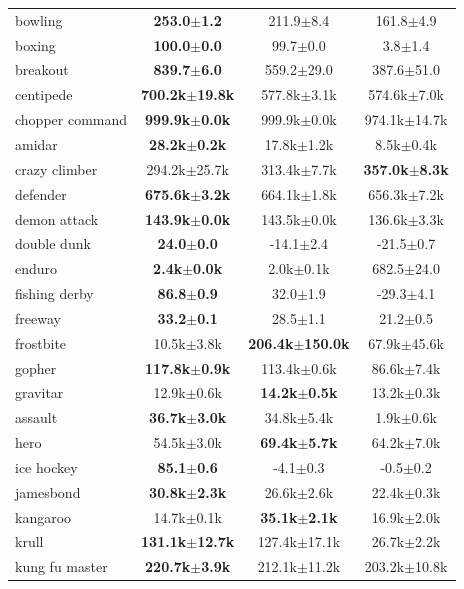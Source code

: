 \documentclass{article} %
\begin{document}
\begin{table}[ht!]
\begin{tabular}{l|c|c|c}
bowling  & \textbf{253.0$\pm$1.2} & 211.9$\pm$8.4 & 161.8$\pm$4.9 \\
boxing  & \textbf{100.0$\pm$0.0} & 99.7$\pm$0.0 & 3.8$\pm$1.4 \\
breakout  & \textbf{839.7$\pm$6.0} & 559.2$\pm$29.0 & 387.6$\pm$51.0 \\
centipede  & \textbf{700.2k$\pm$19.8k} & 577.8k$\pm$3.1k & 574.6k$\pm$7.0k \\
chopper command  & \textbf{999.9k$\pm$0.0k} & 999.9k$\pm$0.0k & 974.1k$\pm$14.7k \\
amidar  & \textbf{28.2k$\pm$0.2k} & 17.8k$\pm$1.2k & 8.5k$\pm$0.4k \\
crazy climber  & 294.2k$\pm$25.7k & 313.4k$\pm$7.7k & \textbf{357.0k$\pm$8.3k} \\
defender  & \textbf{675.6k$\pm$3.2k} & 664.1k$\pm$1.8k & 656.3k$\pm$7.2k \\
demon attack  & \textbf{143.9k$\pm$0.0k} & 143.5k$\pm$0.0k & 136.6k$\pm$3.3k \\
double dunk  & \textbf{24.0$\pm$0.0} & -14.1$\pm$2.4 & -21.5$\pm$0.7 \\
enduro  & \textbf{2.4k$\pm$0.0k} & 2.0k$\pm$0.1k & 682.5$\pm$24.0 \\
fishing derby  & \textbf{86.8$\pm$0.9} & 32.0$\pm$1.9 & -29.3$\pm$4.1 \\
freeway  & \textbf{33.2$\pm$0.1} & 28.5$\pm$1.1 & 21.2$\pm$0.5 \\
frostbite  & 10.5k$\pm$3.8k & \textbf{206.4k$\pm$150.0k} & 67.9k$\pm$45.6k \\
gopher  & \textbf{117.8k$\pm$0.9k} & 113.4k$\pm$0.6k & 86.6k$\pm$7.4k \\
gravitar  & 12.9k$\pm$0.6k & \textbf{14.2k$\pm$0.5k} & 13.2k$\pm$0.3k \\
assault  & \textbf{36.7k$\pm$3.0k} & 34.8k$\pm$5.4k & 1.9k$\pm$0.6k \\
hero  & 54.5k$\pm$3.0k & \textbf{69.4k$\pm$5.7k} & 64.2k$\pm$7.0k \\
ice hockey  & \textbf{85.1$\pm$0.6} & -4.1$\pm$0.3 & -0.5$\pm$0.2 \\
jamesbond  & \textbf{30.8k$\pm$2.3k} & 26.6k$\pm$2.6k & 22.4k$\pm$0.3k \\
kangaroo  & 14.7k$\pm$0.1k & \textbf{35.1k$\pm$2.1k} & 16.9k$\pm$2.0k \\
krull  & \textbf{131.1k$\pm$12.7k} & 127.4k$\pm$17.1k & 26.7k$\pm$2.2k \\
kung fu master  & \textbf{220.7k$\pm$3.9k} & 212.1k$\pm$11.2k & 203.2k$\pm$10.8k \\

\end{tabular}
\end{table}
\end{document}
